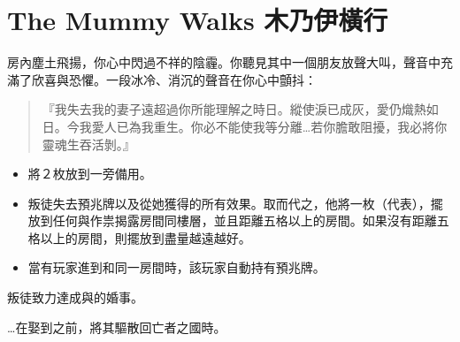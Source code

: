 
\chapter{The Mummy Walks 木乃伊橫行}

\begin{HauntStory}
  房內塵土飛揚，你心中閃過不祥的陰霾。你聽見其中一個朋友放聲大叫，聲音中充滿了欣喜與恐懼。一段冰冷、消沉的聲音在你心中顫抖：

  \begin{quote}
    『我失去我的妻子遠超過你所能理解之時日。縱使淚已成灰，愛仍熾熱如日。今我愛人已為我重生。你必不能使我等分離…若你膽敢阻擾，我必將你靈魂生吞活剝。』
  \end{quote}
\end{HauntStory}

\vspace*{-1em}
\begin{itemize}
  \item 將２枚放到一旁備用。
  \item 叛徒失去預兆牌以及從她獲得的所有效果。取而代之，他將一枚（代表），擺放到任何與作祟揭露房間同樓層，並且距離五格以上的房間。如果沒有距離五格以上的房間，則擺放到盡量越遠越好。
  \item 當有玩家進到和同一房間時，該玩家自動持有預兆牌。
\end{itemize}


叛徒致力達成與的婚事。


…在娶到之前，將其驅散回亡者之國時。

\vfill\null\pagebreak

